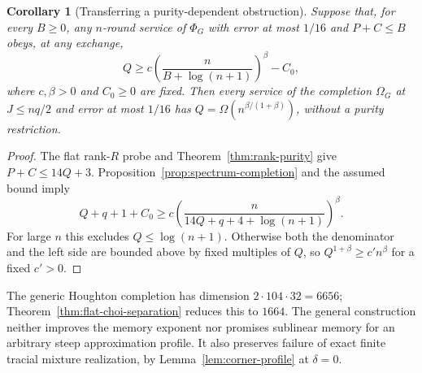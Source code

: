 \documentclass[11pt,a4paper]{article}
\theoremstyle{plain}
\newtheorem{corollary}[theorem]{Corollary}
\theoremstyle{definition}
\theoremstyle{remark}
\begin{document}
\begin{corollary}[Transferring a purity-dependent obstruction]\label{cor:completion-memory}
Suppose that, for every $B\ge0$, any $n$-round service of $\Phi_G$ with error at most $1/16$ and $P+C\le B$ obeys, at any exchange,
\[
Q\ge c\left(\frac{n}{B+\log(n+1)}\right)^\beta-C_0,
\]
where $c,\beta>0$ and $C_0\ge0$ are fixed. Then every service of the completion $\Omega_G$ at $J\le nq/2$ and error at most $1/16$ has
$Q=\Omega(n^{\beta/(1+\beta)})$, without a purity restriction.
\end{corollary}

\begin{proof}
The flat rank-$R$ probe and Theorem~\ref{thm:rank-purity} give $P+C\le14Q+3$. Proposition~\ref{prop:spectrum-completion} and the assumed bound imply
\[
Q+q+1+C_0\ge c\left(\frac{n}{14Q+q+4+\log(n+1)}\right)^\beta.
\]
For large $n$ this excludes $Q\le\log(n+1)$. Otherwise both the denominator and the left side are bounded above by fixed multiples of $Q$,
so $Q^{1+\beta}\ge c'n^\beta$ for a fixed $c'>0$.
\end{proof}

The generic Houghton completion has dimension $2\cdot104\cdot32=6656$; Theorem~\ref{thm:flat-choi-separation} reduces this to $1664$.
The general construction neither improves the memory exponent nor promises sublinear memory for an arbitrary steep approximation profile.
It also preserves failure of exact finite tracial mixture realization, by Lemma~\ref{lem:corner-profile} at $\delta=0$.
\end{document}
